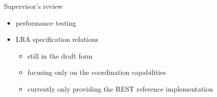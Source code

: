 \documentclass{beamer}
\begin{document}
\begin{frame}{Supervisor's review}
    \Large
    \begin{itemize}
        \item performance testing
        \item LRA specification relations
        \begin{itemize}
            \item still in the draft form
            \item focusing only on the coordination capabilities
            \item currently only providing the REST reference implementation
        \end{itemize}
    \end{itemize}
\end{frame}
\end{document}

